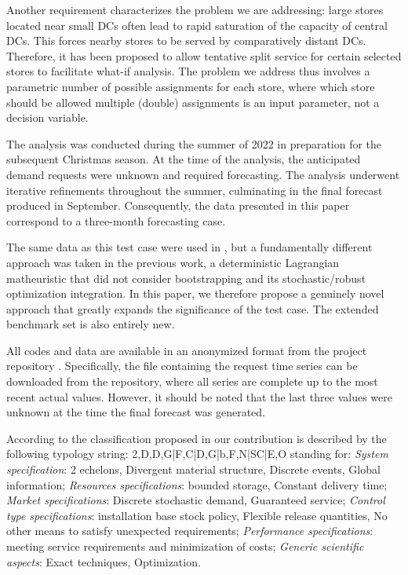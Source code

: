 \documentclass[opre,sglanonrev,11pt]{informs4}
\begin{document}
Another requirement characterizes the problem we are addressing: large stores located near small DCs often lead to rapid saturation of the capacity of central DCs. This forces nearby stores to be served by comparatively distant DCs. Therefore, it has been proposed to allow tentative split service for certain selected stores to facilitate what-if analysis. The problem we address thus involves a parametric number of possible assignments for each store, where which store should be allowed multiple (double) assignments is an input parameter, not a decision variable.  

The analysis was conducted during the summer of 2022 in preparation for the subsequent Christmas season. At the time of the analysis, the anticipated demand requests were unknown and required forecasting. The analysis underwent iterative refinements throughout the summer, culminating in the final forecast produced in September. Consequently, the data presented in this paper correspond to a three-month forecasting case. 

The same data as this test case were used in \citep{MZ23}, but a fundamentally different approach was taken in the previous work, a deterministic Lagrangian matheuristic that did not consider bootstrapping and its stochastic/robust optimization integration. In this paper, we therefore propose a genuinely novel approach that greatly expands the significance of the test case. The extended benchmark set is also entirely new.

All codes and data are available in an anonymized format from the project repository \citep{GDOforecastRepo}. Specifically, the file containing the request time series can be downloaded from the repository, where all series are complete up to the most recent actual values. However, it should be noted that the last three values were unknown at the time the final forecast was generated. 

According to the classification proposed in \cite{DEKOK2018} our contribution is described by the following typology string: 2,D,D,G|F,C|D,G|b,F,N|SC|E,O
standing for: {\it System specification}: 2 echelons, Divergent material structure, Discrete events, Global information; {\it Resources specifications}: bounded storage, Constant delivery time; {\it Market specifications}: Discrete stochastic demand, Guaranteed service; {\it Control type specifications}: installation base stock policy, Flexible release quantities, No other means to satisfy unexpected requirements; {\it Performance specifications}: meeting service requirements and minimization of costs; {\it Generic scientific aspects}: Exact techniques, Optimization.
\end{document}
